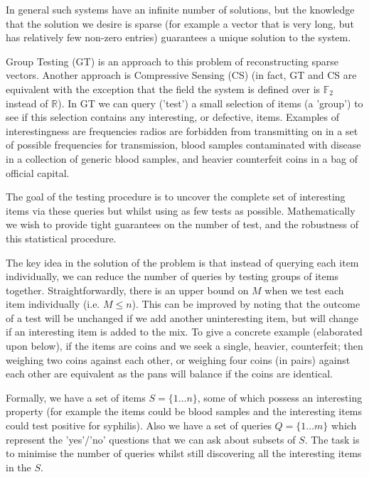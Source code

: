 \documentclass{article}
\begin{document}
In general such systems have an infinite number of solutions, but the knowledge that the solution we desire is sparse (for example a vector that is very long, but has relatively few non-zero entries) guarantees a unique solution to the system. 

Group Testing (GT) is an approach to this problem of reconstructing sparse vectors. Another approach is Compressive Sensing (CS) (in fact, GT and CS are equivalent with the exception that the field the system is defined over is \(\mathbb{F}_2\) instead of \(\mathbb{R}\)). In GT we can query ('test') a small selection of items (a 'group') to see if this selection contains any interesting, or defective, items. Examples of interestingness are frequencies radios are forbidden from transmitting on in a set of possible frequencies for transmission, blood samples contaminated with disease in a collection of generic blood samples, and heavier counterfeit coins in a bag of official capital. 

The goal of the testing procedure is to uncover the complete set of interesting items via these queries but whilst using as few tests as possible. Mathematically we wish to provide tight guarantees on the number of test, and the robustness of this statistical procedure.

The key idea in the solution of the problem is that instead of querying each item individually, we can reduce the number of queries by testing groups of items together. Straightforwardly, there is an upper bound on \(M\) when we test each item individually (i.e. \(M \leq n\)). This can be improved by noting that the outcome of a test will be unchanged if we add another uninteresting item, but will change if an interesting item is added to the mix. To give a concrete example (elaborated upon below), if the items are coins and we seek a single, heavier, counterfeit; then weighing two coins against each other, or weighing four coins (in pairs) against each other are equivalent as the pans will balance if the coins are identical.

Formally, we have a set of items \(S = \{1\ldots n\}\), some of which possess an interesting property (for example the items could be blood samples and the interesting items could test positive for syphilis). Also we have a set of queries \(Q = \{1\ldots m\}\) which represent the 'yes'/'no' questions that we can ask about subsets of \(S\). The task is to minimise the number of queries whilst still discovering all the interesting items in the \(S\). 
\end{document}
